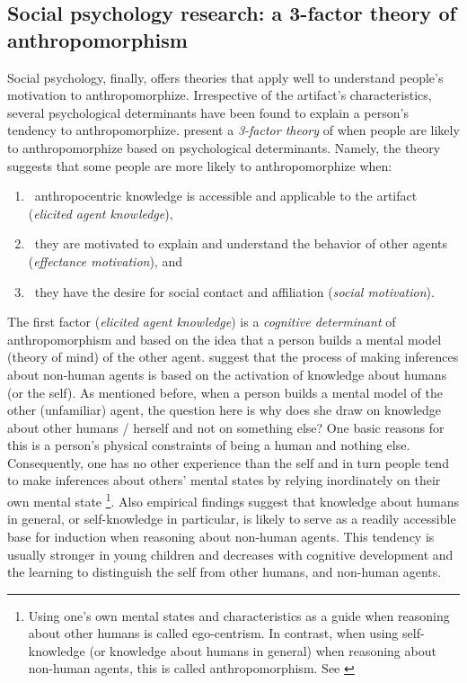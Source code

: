 \documentclass{frontiersSCNS} %
\begin{document}
\subsection{Social psychology research: a 3-factor theory of anthropomorphism}
\label{sec:psychological-factors}

Social psychology, finally, offers theories that apply well to understand
people's motivation to anthropomorphize. Irrespective of the artifact's
characteristics, several psychological determinants have been found to explain a
person's tendency to anthropomorphize. \cite{epley_seeing_2007} present a
\emph{3-factor theory} of when people are likely to anthropomorphize based on
psychological determinants. Namely, the theory suggests that some people are
more likely to anthropomorphize when: 

\begin{enumerate}
	\item ~anthropocentric knowledge is accessible and applicable to the artifact (\textit{elicited agent knowledge}),
	\item ~they are motivated to explain and understand the behavior of other agents (\textit{effectance motivation}), and
	\item ~they have the desire for social contact and affiliation (\textit{social motivation}).
\end{enumerate}

The first factor (\textit{elicited agent knowledge}) is a \emph{cognitive
determinant} of anthropomorphism and based on the idea that a person builds a
mental model (theory of mind) of the other agent. \citet{epley_seeing_2007}
suggest that the process of making inferences about non-human agents is based on
the activation of knowledge about humans (or the self). As mentioned before,
when a person builds a mental model of the other (unfamiliar) agent, the
question here is why does she draw on knowledge about other humans / herself and
not on something else? One basic reasons for this is a person's physical
constraints of being a human and nothing else. Consequently, one has no other
experience than the self and in turn people tend to make inferences about
others' mental states by relying inordinately on their own mental state
\footnote{Using one's own mental states and characteristics as a guide when
reasoning about other humans is called ego-centrism. In contrast, when using
self-knowledge (or knowledge about humans in general) when reasoning about
non-human agents, this is called anthropomorphism. See
\cite{epley_seeing_2007}}.  Also empirical findings suggest that knowledge about
humans in general, or self-knowledge in particular, is likely to serve as a
readily accessible base for induction when reasoning about non-human agents.
This tendency is usually stronger in young children and decreases with cognitive
development and the learning to distinguish the self from other humans, and
non-human agents. 
\end{document}
